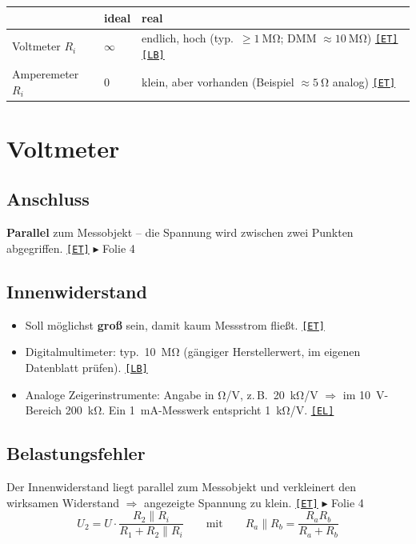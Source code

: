 \documentclass[11pt,a4paper]{article}
\newcommand{\q}[1]{\hyperlink{src:#1}{\textcolor{quelle}{\texttt{\footnotesize[#1]}}}}
\newcommand{\folie}[1]{\textcolor{akzent}{\footnotesize\textsf{$\blacktriangleright$ Folie #1}}}
\begin{document}
\begin{tabularx}{\textwidth}{@{}lll@{}}
\toprule
 & ideal & real\\ \midrule
Voltmeter $R_i$ & $\infty$ & endlich, hoch (typ.\ $\geq\SI{1}{\mega\ohm}$; DMM $\approx\SI{10}{\mega\ohm}$) \q{ET}\,\q{LB}\\
Amperemeter $R_i$ & 0 & klein, aber vorhanden (Beispiel $\approx\SI{5}{\ohm}$ analog) \q{ET}\\
\bottomrule
\end{tabularx}

\section{Voltmeter}\label{sec:volt}

\subsection{Anschluss}
\textbf{Parallel} zum Messobjekt -- die Spannung wird zwischen zwei Punkten abgegriffen. \q{ET} \folie{4}

\subsection{Innenwiderstand}
\begin{itemize}
  \item Soll möglichst \textbf{groß} sein, damit kaum Messstrom fließt. \q{ET}
  \item Digitalmultimeter: typ.\ \SI{10}{\mega\ohm} (gängiger Herstellerwert, im eigenen Datenblatt prüfen). \q{LB}
  \item Analoge Zeigerinstrumente: Angabe in \si{\ohm/\volt}, z.\,B.\ \SI{20}{\kilo\ohm/\volt} $\Rightarrow$ im \SI{10}{\volt}-Bereich \SI{200}{\kilo\ohm}. Ein \SI{1}{\milli\ampere}-Messwerk entspricht \SI{1}{\kilo\ohm/\volt}. \q{EL}
\end{itemize}

\subsection{Belastungsfehler}\label{sec:belastung}
Der Innenwiderstand liegt parallel zum Messobjekt und verkleinert den wirksamen Widerstand $\Rightarrow$ angezeigte Spannung zu klein. \q{ET} \folie{4}
\begin{equation}\label{f:teiler}
U_2 = U\cdot\frac{R_2\parallel R_i}{R_1+R_2\parallel R_i}\qquad\text{mit}\qquad
R_a\parallel R_b=\frac{R_a R_b}{R_a+R_b}
\end{equation}
\end{document}
